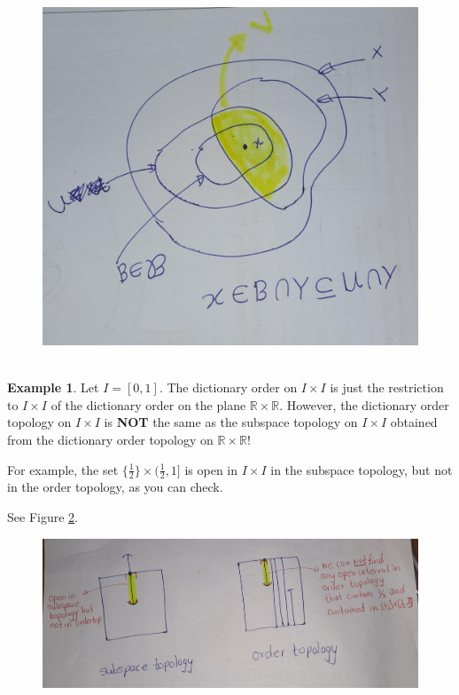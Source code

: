 \documentclass[
]{book}
\theoremstyle{definition}
\theoremstyle{definition}
\newtheorem{example}{Example}[chapter]
\theoremstyle{definition}
\theoremstyle{definition}
\theoremstyle{remark}
\begin{document}
\begin{figure}
\centering
\includegraphics{figures/figure 13.jpg}
\caption{\label{fig:fig13}\(~\)}
\end{figure}

\begin{example}
\protect\hypertarget{exm:unnamed-chunk-46}{}\label{exm:unnamed-chunk-46}Let \(I = [0, 1]\). The dictionary order on \(I \times I\) is just the restriction to \(I \times I\) of the dictionary order on the plane \(\mathbb{R} \times \mathbb{R}\). However, the dictionary order topology on \(I \times I\) is \textbf{NOT} the same as the subspace topology on \(I \times I\) obtained from the dictionary order topology on \(\mathbb{R} \times \mathbb{R}\)!

For example, the set \(\{\frac{1}{2}\} \times (\frac{1}{2}, 1]\) is open in \(I \times I\) in the
subspace topology, but not in the order topology, as you can check.

See Figure \ref{fig:fig14}.
\end{example}

\begin{figure}
\centering
\includegraphics{figures/figure 14.jpg}
\caption{\label{fig:fig14}\(~\)}
\end{figure}
\end{document}
